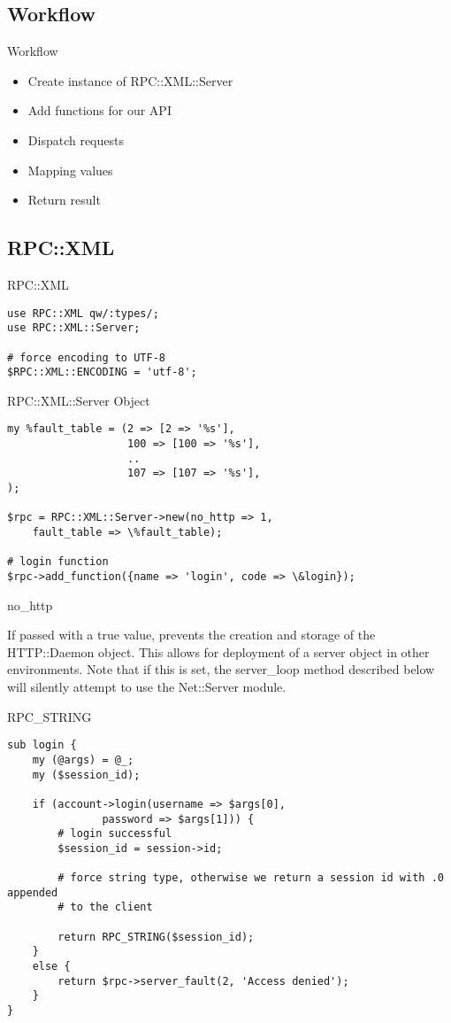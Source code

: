\subsection{Workflow}
\begin{frame}{Workflow}
\begin{itemize}
\item Create instance of RPC::XML::Server
\item Add functions for our API
\item Dispatch requests
\item Mapping values
\item Return result
\end{itemize}
\end{frame}

\subsection{RPC::XML}
\begin{frame}[fragile]{RPC::XML}
\begin{lstlisting}
use RPC::XML qw/:types/;
use RPC::XML::Server;

# force encoding to UTF-8
$RPC::XML::ENCODING = 'utf-8';
\end{lstlisting}
\end{frame}

\begin{frame}[fragile]{RPC::XML::Server Object}
\begin{lstlisting}
my %fault_table = (2 => [2 => '%s'],
                   100 => [100 => '%s'],
                   ..
                   107 => [107 => '%s'],
);

$rpc = RPC::XML::Server->new(no_http => 1, 
    fault_table => \%fault_table);

# login function
$rpc->add_function({name => 'login', code => \&login});
\end{lstlisting}
\end{frame}

no_http

If passed with a true value, prevents the creation and storage of the
HTTP::Daemon object. This allows for deployment of a server object in other
environments. Note that if this is set, the server_loop method described
below will silently attempt to use the Net::Server module.

\begin{frame}[fragile]{RPC\_STRING}
\begin{lstlisting}
sub login {
    my (@args) = @_;
    my ($session_id);

    if (account->login(username => $args[0],
		       password => $args[1])) {
        # login successful
        $session_id = session->id;

        # force string type, otherwise we return a session id with .0 appended
        # to the client

        return RPC_STRING($session_id);
    }
    else {
        return $rpc->server_fault(2, 'Access denied');
    }
}
\end{lstlisting}
\end{frame}

